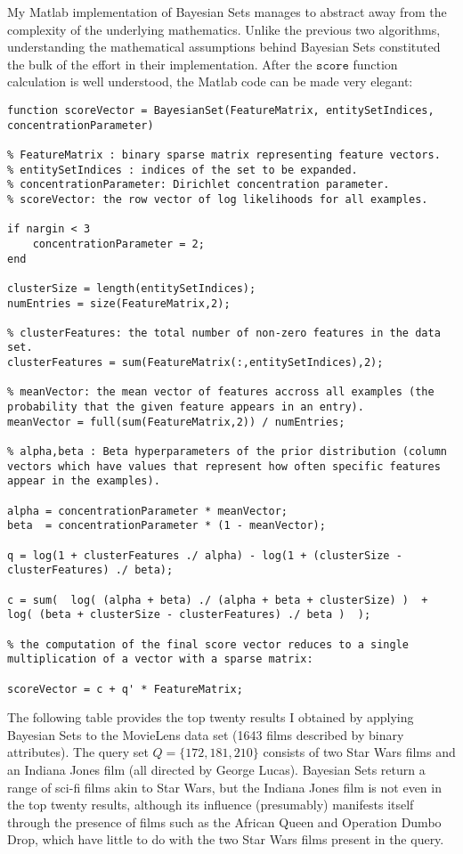 \documentclass[12pt,twoside,notitlepage,amsart]{report} %
\begin{document}
  My Matlab implementation of Bayesian Sets manages to abstract away from the complexity of the underlying mathematics. Unlike the previous two algorithms, understanding the mathematical assumptions behind Bayesian Sets constituted the bulk of the effort in their implementation. After the $\texttt{score}$ function calculation is well understood, the Matlab code can be made very elegant:
  
\lstset{linewidth=16cm}

\begin{lstlisting}
function scoreVector = BayesianSet(FeatureMatrix, entitySetIndices, concentrationParameter)

% FeatureMatrix : binary sparse matrix representing feature vectors.
% entitySetIndices : indices of the set to be expanded.
% concentrationParameter: Dirichlet concentration parameter.
% scoreVector: the row vector of log likelihoods for all examples.

if nargin < 3
    concentrationParameter = 2;
end

clusterSize = length(entitySetIndices);
numEntries = size(FeatureMatrix,2);

% clusterFeatures: the total number of non-zero features in the data set. 
clusterFeatures = sum(FeatureMatrix(:,entitySetIndices),2); 

% meanVector: the mean vector of features accross all examples (the probability that the given feature appears in an entry).
meanVector = full(sum(FeatureMatrix,2)) / numEntries;

% alpha,beta : Beta hyperparameters of the prior distribution (column vectors which have values that represent how often specific features appear in the examples).

alpha = concentrationParameter * meanVector;
beta  = concentrationParameter * (1 - meanVector);

q = log(1 + clusterFeatures ./ alpha) - log(1 + (clusterSize - clusterFeatures) ./ beta);

c = sum(  log( (alpha + beta) ./ (alpha + beta + clusterSize) )  +  log( (beta + clusterSize - clusterFeatures) ./ beta )  );

% the computation of the final score vector reduces to a single multiplication of a vector with a sparse matrix:

scoreVector = c + q' * FeatureMatrix;

\end{lstlisting} 

  	
	The following table provides the top twenty results I obtained by applying Bayesian Sets to the MovieLens data set (1643 films described by binary attributes). The query set $Q = \{ 172, 181, 210 \}$ consists of two Star Wars films and an Indiana Jones film (all directed by George Lucas). Bayesian Sets return a range of sci-fi films akin to Star Wars, but the Indiana Jones film is not even in the top twenty results, although its influence (presumably) manifests itself through the presence of films such as the African Queen and Operation Dumbo Drop, which have little to do with the two Star Wars films present in the query. \\
	
\end{document}
